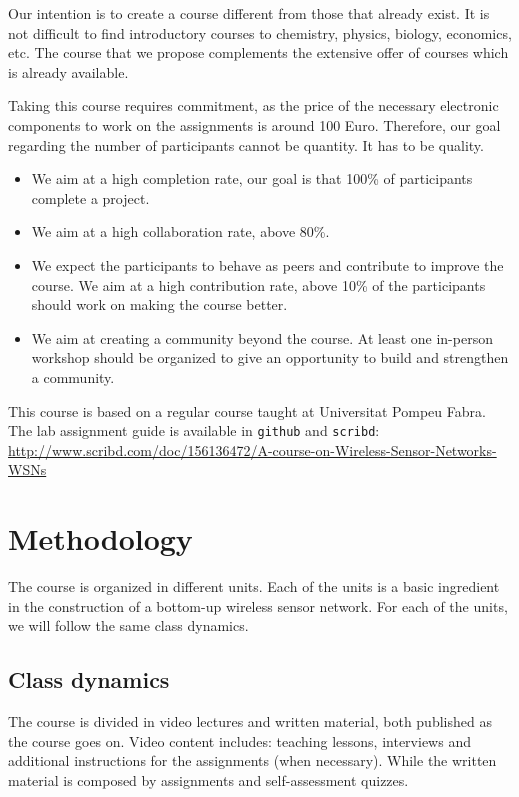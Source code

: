 \documentclass[a4paper,oneside]{book}   %
\begin{document}
Our intention is to create a course different from those that already exist.
It is not difficult to find introductory courses to chemistry, physics, biology, economics, etc.
The course that we propose complements the extensive offer of courses which is already available.

Taking this course requires commitment, as the price of the necessary electronic components to work on the assignments is around 100 Euro.
Therefore, our goal regarding the number of participants cannot be quantity.
It has to be quality.

\begin{itemize}
\item We aim at a high completion rate,  our goal is that 100\%  of participants complete a project.
\item We aim at a high collaboration rate, above 80\%.
\item We expect the participants to behave as peers and contribute to improve the course.
We aim at a high contribution rate, above 10\% of the participants should work on making the course better.
\item We aim at creating a community beyond the course.
At least one in-person workshop should be organized to give an opportunity to build and strengthen a community.
\end{itemize}

This course is based on a regular course taught at Universitat Pompeu Fabra.
The lab assignment guide is available in \texttt{github} and \texttt{scribd}: \url{http://www.scribd.com/doc/156136472/A-course-on-Wireless-Sensor-Networks-WSNs}


\section{Methodology}

The course is organized in different units.
Each of the units is a basic ingredient in the construction of a bottom-up wireless sensor network.
For each of the units, we will follow the same class dynamics.

\subsection{Class dynamics}

The course is divided in video lectures and written material, both published as the course goes on. Video content includes: teaching lessons, interviews and additional instructions for the assignments (when necessary). While the written material is composed by assignments and self-assessment quizzes. 
\end{document}
